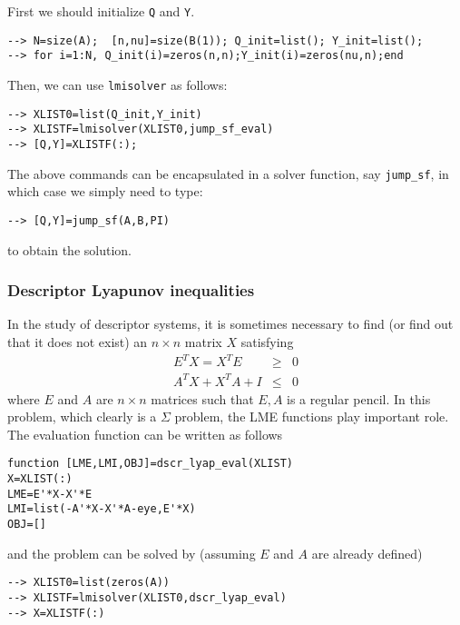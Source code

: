 First we should initialize {\tt Q} and {\tt Y}. 
\begin{verbatim}
--> N=size(A);  [n,nu]=size(B(1)); Q_init=list(); Y_init=list();
--> for i=1:N, Q_init(i)=zeros(n,n);Y_init(i)=zeros(nu,n);end
\end{verbatim}
Then, we can use {\tt lmisolver} as follows:
\begin{verbatim}
--> XLIST0=list(Q_init,Y_init)
--> XLISTF=lmisolver(XLIST0,jump_sf_eval)
--> [Q,Y]=XLISTF(:);
\end{verbatim}

The above commands can be encapsulated in a solver function, say 
{\tt jump{\_}sf},
in which case we simply need to type:
\begin{verbatim}
--> [Q,Y]=jump_sf(A,B,PI)         
\end{verbatim}
to obtain the solution.


\subsubsection{Descriptor Lyapunov inequalities}
\label{ex3}
In the study of descriptor systems, it is sometimes 
necessary to find (or find out that it does not exist)
an $n\times n$ matrix $X$ satisfying
\begin{eqnarray*}
E^TX=X^TE&\geq&0\\
A^TX+X^TA+I&\leq&0
\end{eqnarray*}
where $E$ and $A$ are $n\times n$ matrices such that ${E,A}$ is a regular pencil.
In this problem, which clearly is a $\Sigma$ problem,
the LME functions play important role. The evaluation function
can be written as follows
\begin{verbatim}
function [LME,LMI,OBJ]=dscr_lyap_eval(XLIST)
X=XLIST(:)
LME=E'*X-X'*E
LMI=list(-A'*X-X'*A-eye,E'*X)
OBJ=[]
\end{verbatim}
and the problem can be solved by (assuming $E$ and $A$ are
already defined)
\begin{verbatim}
--> XLIST0=list(zeros(A))
--> XLISTF=lmisolver(XLIST0,dscr_lyap_eval)
--> X=XLISTF(:)
\end{verbatim}

